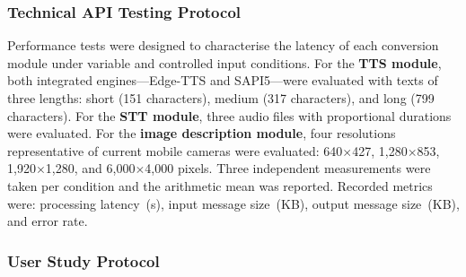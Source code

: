 \documentclass[journal]{IEEEtran}
\begin{document}
	\subsubsection{Technical API Testing Protocol}
	Performance tests were designed to characterise the latency of
	each conversion module under variable and controlled input
	conditions.
	For the \textbf{TTS module}, both integrated engines---Edge-TTS
	and SAPI5---were evaluated with texts of three lengths:
	short (151 characters), medium (317 characters),
	and long (799 characters).
	For the \textbf{STT module}, three audio files with proportional
	durations were evaluated.
	For the \textbf{image description module}, four resolutions
	representative of current mobile cameras were evaluated:
	640$\times$427, 1{,}280$\times$853, 1{,}920$\times$1{,}280,
	and 6{,}000$\times$4{,}000 pixels.
	Three independent measurements were taken per condition and the
	arithmetic mean was reported.
	Recorded metrics were: processing latency~(s), input message
	size~(KB), output message size~(KB), and error rate.
	
	\subsubsection{User Study Protocol}
	
\end{document}
